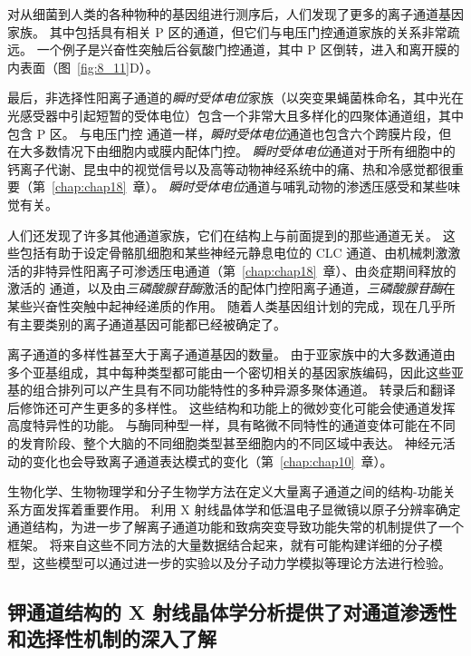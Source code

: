 对从细菌到人类的各种物种的基因组进行测序后，人们发现了更多的离子通道基因家族。
其中包括具有相关 P 区的通道，但它们与电压门控通道家族的关系非常疏远。
一个例子是兴奋性突触后谷氨酸门控通道，其中 P 区倒转，进入和离开膜的内表面（图~\ref{fig:8_11}D）。


最后，非选择性阳离子通道的\textit{瞬时受体电位}家族（以突变果蝇菌株命名，其中光在光感受器中引起短暂的受体电位）包含一个非常大且多样化的四聚体通道组，其中包含 P 区。
与电压门控  通道一样，\textit{瞬时受体电位}通道也包含六个跨膜片段，但在大多数情况下由细胞内或膜内配体门控。
\textit{瞬时受体电位}通道对于所有细胞中的钙离子代谢、昆虫中的视觉信号以及高等动物神经系统中的痛、热和冷感觉都很重要（第~\ref{chap:chap18}~章）。
\textit{瞬时受体电位}通道与哺乳动物的渗透压感受和某些味觉有关。


人们还发现了许多其他通道家族，它们在结构上与前面提到的那些通道无关。
这些包括有助于设定骨骼肌细胞和某些神经元静息电位的 CLC  通道、由机械刺激激活的非特异性阳离子可渗透压电通道（第~\ref{chap:chap18}~章）、由炎症期间释放的  激活的  通道，以及由\textit{三磷酸腺苷酶}激活的配体门控阳离子通道，\textit{三磷酸腺苷酶}在某些兴奋性突触中起神经递质的作用。
随着人类基因组计划的完成，现在几乎所有主要类别的离子通道基因可能都已经被确定了。


离子通道的多样性甚至大于离子通道基因的数量。
由于亚家族中的大多数通道由多个亚基组成，其中每种类型都可能由一个密切相关的基因家族编码，因此这些亚基的组合排列可以产生具有不同功能特性的多种异源多聚体通道。
转录后和翻译后修饰还可产生更多的多样性。
这些结构和功能上的微妙变化可能会使通道发挥高度特异性的功能。
与酶同种型一样，具有略微不同特性的通道变体可能在不同的发育阶段、整个大脑的不同细胞类型甚至细胞内的不同区域中表达。
神经元活动的变化也会导致离子通道表达模式的变化（第~\ref{chap:chap10}~章）。


生物化学、生物物理学和分子生物学方法在定义大量离子通道之间的结构-功能关系方面发挥着重要作用。
利用 X 射线晶体学和低温电子显微镜以原子分辨率确定通道结构，为进一步了解离子通道功能和致病突变导致功能失常的机制提供了一个框架。
将来自这些不同方法的大量数据结合起来，就有可能构建详细的分子模型，这些模型可以通过进一步的实验以及分子动力学模拟等理论方法进行检验。





\subsection{钾通道结构的 X 射线晶体学分析提供了对通道渗透性和选择性机制的深入了解}

